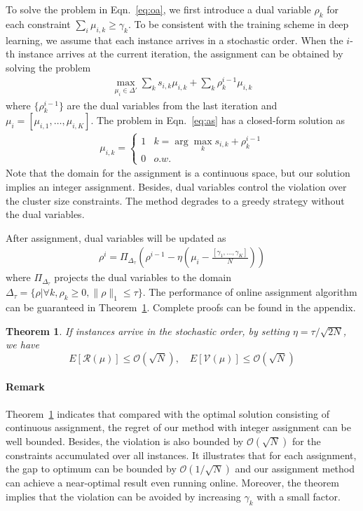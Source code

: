 \documentclass[10pt,twocolumn,letterpaper]{article}
\def \R {\mathcal{R}}
\def \V {\mathcal{V}}
\def \OO {\mathcal{O}}
\newtheorem{thm}{Theorem}
\begin{document}
To solve the problem in Eqn.~\ref{eq:oa}, we first introduce a dual variable $\rho_k$ for each constraint $\sum_i \mu_{i,k} \geq \gamma_k$. To be consistent with the training scheme in deep learning, we assume that each instance arrives in a stochastic order. When the $i$-th instance arrives at the current iteration, the assignment can be obtained by solving the problem
\begin{eqnarray}\label{eq:as}
\max_{\mu_{i}\in\Delta'}  \sum_k s_{i,k} \mu_{i,k} + \sum_k\rho_k^{i-1} \mu_{i,k}
\end{eqnarray}
where $\{\rho_k^{i-1}\}$ are the dual variables from the last iteration and $\mu_i = [\mu_{i,1},\dots, \mu_{i,K}]$. The problem in Eqn.~\ref{eq:as} has a closed-form solution as
\begin{eqnarray}\label{eq:solution}
\mu_{i,k} = \left\{\begin{array}{cc}1&k=\arg\max_k s_{i,k}+\rho_k^{i-1}\\0&o.w.\end{array}\right.
\end{eqnarray}
Note that the domain for the assignment is a continuous space, but our solution implies an integer assignment. Besides, dual variables control the violation over the cluster size constraints. The method degrades to a greedy strategy without the dual variables.  

After assignment, dual variables will be updated as
\begin{eqnarray*}
\rho^i = \Pi_{\Delta_\tau}(\rho^{i-1} - \eta ( \mu_{i}-\frac{[\gamma_1,\dots,\gamma_K]}{N}))
\end{eqnarray*}
where $\Pi_{\Delta_\tau}$ projects the dual variables to the domain $\Delta_\tau = \{\rho| \forall k, \rho_k\geq0, \|\rho\|_1\leq \tau\}$. The performance of online assignment algorithm can be guaranteed in Theorem~\ref{thm:1}. Complete proofs can be found in the appendix.


\begin{thm}\label{thm:1}
If instances arrive in the stochastic order, by setting $\eta = \tau/\sqrt{2N}$, we have
\[E[\R(\mu)]\leq \OO(\sqrt{N}),\quad E[\V(\mu)]\leq \OO(\sqrt{N})\]
\end{thm}

\paragraph{Remark} Theorem~\ref{thm:1} indicates that compared with the optimal solution consisting of continuous assignment, the regret of our method with integer assignment can be well bounded. Besides, the violation is also bounded by $\OO(\sqrt{N})$ for the constraints accumulated over all instances. It illustrates that for each assignment, the gap to optimum can be bounded by $\OO(1/\sqrt{N})$ and our assignment method can achieve a near-optimal result even running online. Moreover, the theorem implies that the violation can be avoided by increasing $\gamma_k$ with a small factor.
\end{document}
